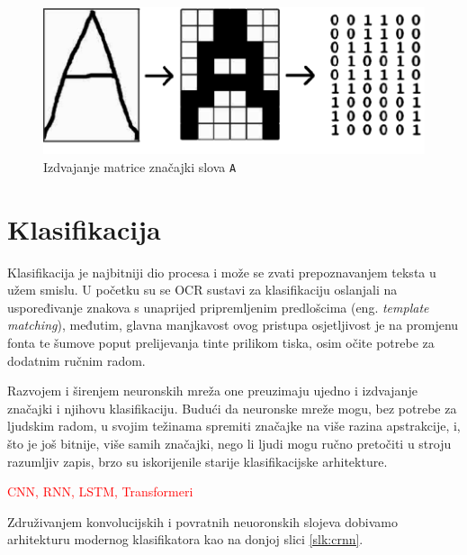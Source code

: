 \documentclass[zavrsnirad]{fer}
\begin{document}
\begin{figure}[hbt]
	\centering
	\includegraphics[width=0.9\linewidth]{Figures/simple-letter-matrix.png} 
	\caption{Izdvajanje matrice značajki slova \texttt{A} \cite{Noaman2015}}
	\label{slk:jednostavna-matrica}
\end{figure}


\section{Klasifikacija}

Klasifikacija je najbitniji dio procesa i može se zvati prepoznavanjem teksta u užem smislu. U početku su se OCR sustavi za klasifikaciju oslanjali na uspoređivanje znakova s unaprijed pripremljenim predlošcima (eng. \textit{template matching}), međutim, glavna manjkavost ovog pristupa osjetljivost je na promjenu fonta te šumove poput prelijevanja tinte prilikom tiska, osim očite potrebe za dodatnim ručnim radom.

Razvojem i širenjem neuronskih mreža one preuzimaju ujedno i izdvajanje značajki i njihovu klasifikaciju. Budući da neuronske mreže mogu, bez potrebe za ljudskim radom, u svojim težinama spremiti značajke na više razina apstrakcije, i, što je još bitnije, više samih značajki, nego li ljudi mogu ručno pretočiti u stroju razumljiv zapis, brzo su iskorijenile starije klasifikacijske arhitekture. \cite{Wang2012}

 \textcolor{red}{CNN, RNN, LSTM, Transformeri}

Združivanjem konvolucijskih i povratnih neuoronskih slojeva dobivamo arhitekturu modernog klasifikatora kao na donjoj slici \ref{slk:crnn}.
\end{document}
